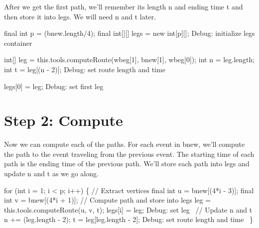 After we get the first path, we'll remember its length {\Tt{}n\nwendquote} and ending time
{\Tt{}t\nwendquote} and then store it into {\Tt{}legs\nwendquote}. We will need {\Tt{}n\nwendquote} and {\Tt{}t\nwendquote} later.

\nwenddocs{}\endmoddef\nwstartdeflinemarkup{}\nwenddeflinemarkup
final int p = (bnew.length/4);
final int[][] legs = new int[p][];
\LA{}Debug: initialize legs container~{\nwtagstyle{}}\RA{}

int[] leg = this.tools.computeRoute(wbeg[1], bnew[1], wbeg[0]);
int n = leg.length;
int t = leg[(n - 2)];
\LA{}Debug: set route length and time~{\nwtagstyle{}}\RA{}

legs[0] = leg;
\LA{}Debug: set first leg~{\nwtagstyle{}}\RA{}
\nwendcode{}\nwdocspar

\section{Step 2: Compute}

Now we can compute each of the paths. For each event in {\Tt{}bnew\nwendquote}, we'll compute
the path to the event traveling from the previous event. The starting time of
each path is the ending time of the previous path. We'll store each path into
{\Tt{}legs\nwendquote} and update {\Tt{}n\nwendquote} and {\Tt{}t\nwendquote} as we go along.

\nwenddocs{}\endmoddef\nwstartdeflinemarkup{}\nwenddeflinemarkup
for (int i = 1; i < p; i++) \{
  // Extract vertices
  final int u = bnew[(4*i - 3)];
  final int v = bnew[(4*i + 1)];
  // Compute path and store into legs
  leg = this.tools.computeRoute(u, v, t);
  legs[i] = leg;
  \LA{}Debug: set leg~{\nwtagstyle{}}\RA{}
  // Update n and t
  n += (leg.length - 2);
  t = leg[leg.length - 2];
  \LA{}Debug: set route length and time~{\nwtagstyle{}}\RA{}
\}
\nwendcode{}\nwdocspar

